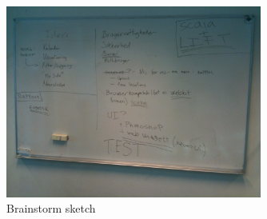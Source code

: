 \begin{figure}[htb]
\begin{center}
\leavevmode
\includegraphics[width=0.75\textwidth]{images/whiteboard6}
\end{center}
\caption{Brainstorm sketch}
\label{fig:app_w6}
\end{figure}
